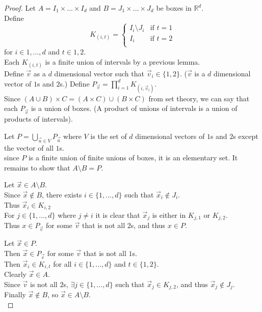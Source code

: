 \documentclass[12pt]{article}
\begin{document}
\begin{proof}
	Let $A = I_{1} \times ... \times I_{d}$ and $B = J_{1} \times ... \times J_{d}$ be boxes in $\mathds{R}^{d}$. \\
	Define 
	\[ 
		K_{(i,t)} =
		\begin{cases} 
			I_{i} \setminus J_{i} & \text{if } t=1 \\
			I_{i} & \text{if } t=2 \\
		\end{cases}
	\]
	for $i \in {1,...,d}$ and $t \in {1,2}$.\\
	Each $K_{(i,t)}$ is a finite union of intervals by a previous lemma.\\
	Define $\vec{v}$ as a $d$ dimensional vector such that $\vec{v}_{i} \in \{1,2\}$. ($\vec{v}$ is a $d$ dimensional vector of $1$s and $2$s.)
	Define $P_{\vec{v}} = \prod\limits_{i=1}^{d} K_{(i,\vec{v}_{i})}$. \\
	Since $(A \cup B) \times C = (A \times C) \cup (B \times C)$ from set theory, we can say that each $P_{\vec{v}}$ is a union of boxes. (A product of unions of intervals is a union of products of intervals). \bigbreak
	
	Let $P = \bigcup\limits_{\vec{u} \in V} P_{\vec{u}}$ where $V$ is the set of $d$ dimensional vectors of $1$s and $2$s except the vector of all $1$s. \\
	since $P$ is a finite union of finite unions of boxes, it is an elementary set. It remains to show that $A \setminus B = P$. \bigbreak
	
	Let $\vec{x} \in A \setminus B$. \\
	Since $\vec{x} \notin B$, there exists $i \in \{1,...,d\}$ such that $\vec{x}_{i} \notin J_{i}$. \\
	Thus $\vec{x}_{i} \in K_{i,2}$ \\
	For $j \in \{1,...,d\}$ where $j \neq i$ it is clear that $\vec{x}_{j}$ is either in $ K_{j,1}$ or $ K_{j,2}$. \\
	Thus $x \in P_{\vec{v}}$ for some $\vec{v}$ that is not all $2$s, and thus $x \in P$. \bigbreak 
	
	Let $\vec{x} \in P$. \\
	Then $\vec{x} \in P_{\vec{v}}$ for some $\vec{v}$ that is not all $1$s. \\
	Then $\vec{x}_{i} \in K_{i,t}$ for all $i \in \{1,...,d\}$ and $t \in \{1,2\}$. \\
	Clearly $\vec{x} \in A$. \\
	Since $\vec{v}$ is not all $2$s, $\exists j \in \{1,...,d\}$ such that $\vec{x}_{j} \in K_{j,2}$, and thus $\vec{x}_{j} \notin J_{j}$. \\
	Finally $\vec{x} \notin B$, so $\vec{x} \in A \setminus B$.	\\
\end{proof}
\end{document}
